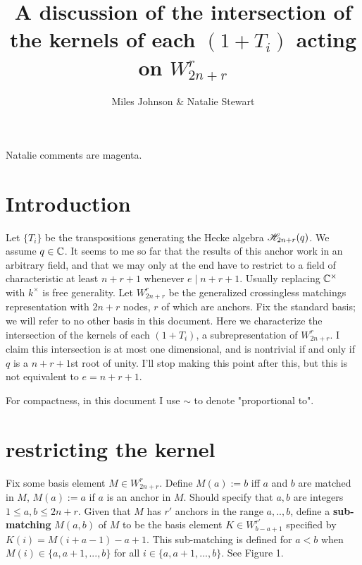 \documentclass{amsart}
\begin{document}
	
\title{A discussion of the intersection of the kernels of each $(1+T_i)$ acting on $W_{2n+r}^r$}
\author{Miles Johnson \& Natalie Stewart}

\maketitle

{\color{magenta} Natalie comments are magenta.}

\section{Introduction} 

Let $\{T_i\}$ be the transpositions generating the Hecke algebra $\mathscr{H}_{2n+r}(q)$. We assume $q\in \mathbb{C}$.
{\color{magenta} It seems to me so far that the results of this anchor work in an arbitrary field, and that we may only at the end have to restrict to a field of characteristic at least $n + r + 1$ whenever $e \mid n + r + 1$.
Usually replacing $\mathbb{C}^\times$ with $k^\times$ is free generality.
}
Let $W_{2n+r}^r$ be the generalized crossingless matchings representation with $2n+r$ nodes, $r$ of which are anchors. Fix the standard basis; we will refer to no other basis in this document. Here we characterize the intersection of the kernels of each $(1+T_i)$, a subrepresentation of $W_{2n+r}^r$. I claim this intersection is at most one dimensional, and is nontrivial if and only if $q$ is a $n+r+1$st root of unity.
{\color{magenta} I'll stop making this point after this, but this is not equivalent to $e = n + r + 1$.}

For compactness, in this document I use $\sim $ to denote "proportional to".

 \section{restricting the kernel}


\begin{definition}
	
  Fix some basis element $M\in W_{2n+r}^r$. Define $M(a):=b$ iff $a$ and $b$ are matched in $M$, $M(a):=a$ if $a$ is an anchor in $M$.
  {\color{magenta} Should specify that $a,b$ are integers $1 \leq a,b \leq 2n + r$.} 
  Given that $M$ has $r'$ anchors in the range $a,..,b$, define a \textbf{sub-matching} $M(a,b)$ of $M$ to be the basis element $K\in W_{b-a+1}^{r'}$ specified by $K(i)=M(i+a-1)-a+1$. This sub-matching is defined for $a<b$ when $M(i)\in \{a,a+1,...,b\}$ for all $i\in \{a,a+1,...,b\}$. See Figure 1.
\end{definition}
\end{document}
